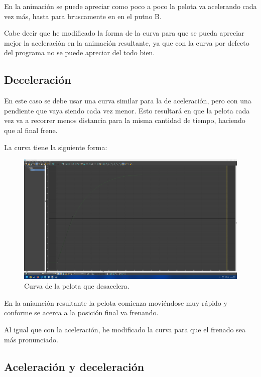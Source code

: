 \documentclass{article}
\begin{document}
En la animación se puede apreciar como poco a poco la pelota va acelerando cada vez más, hasta para bruscamente en en el putno B.

Cabe decir que he modificado la forma de la curva para que se pueda apreciar mejor la aceleración en la animación resultante, ya que con la curva por defecto del programa no se puede apreciar del todo bien.

\subsection{Deceleración}

En este caso se debe usar una curva similar para la de aceleración, pero con una pendiente que vaya siendo cada vez menor. Esto resultará en que la pelota cada vez va a recorrer menos distancia para la misma cantidad de tiempo, haciendo que al final frene.

La curva tiene la siguiente forma:

\begin{figure}[H]
    \centering
    \includegraphics[width=\textwidth]{imagenes/Ejercicio 1/curvas/deceleracion.png}
    \caption{Curva de la pelota que desacelera.}
 \end{figure}


En la aniamción resultante la pelota comienza moviéndose muy rápido y conforme se acerca a la posición final va frenando.

Al igual que con la aceleración, he modificado la curva para que el frenado sea más pronunciado.

\subsection{Aceleración y deceleración}
\end{document}
